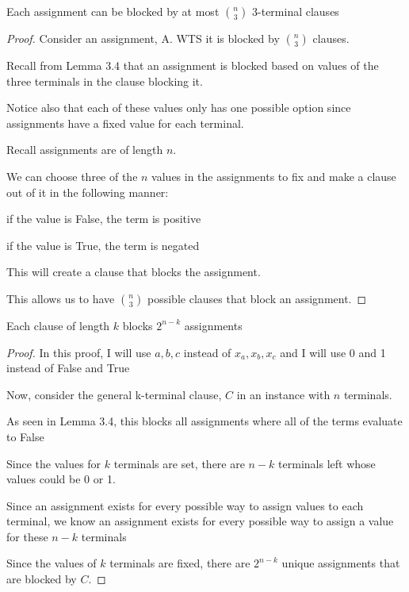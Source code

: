 \documentclass[manuscript]{acmart}
\begin{document}
    \begin{lemma}
        Each assignment can be blocked by at most ${n \choose 3}$ 3-terminal clauses
    \end{lemma}
    \begin{proof}
        Consider an assignment, A. WTS it is blocked by ${n \choose 3}$ clauses.

        Recall from Lemma 3.4 that an assignment is blocked based on values of
        the three terminals in the clause blocking it.

        Notice also that each of these values only has one possible option since
        assignments have a fixed value for each terminal.

        Recall assignments are of length $n$.

        We can choose three of the $n$ values in the assignments to fix and
        make a clause out of it in the following manner:

        if the value is False, the term is positive

        if the value is True, the term is negated

        This will create a clause that blocks the assignment.

        This allows us to have ${n \choose 3}$ possible clauses that block an assignment.
        
    \end{proof}

    \begin{lemma}
        Each clause of length $k$ blocks $2^{n-k}$ assignments
    \end{lemma}
    \begin{proof}
        In this proof, I will use $a, b, c$ instead of $x_a, x_b, x_c$ and
        I will use 0 and 1 instead of False and True

        Now, consider the general k-terminal clause, $C$ in an instance with
        $n$ terminals.

        As seen in Lemma 3.4, this blocks all assignments where all of the terms evaluate to False

        Since the values for $k$ terminals are set, there are $n-k$ terminals left
        whose values could be 0 or 1.

        Since an assignment exists for every possible way to assign values to
        each terminal, we know an assignment exists for every possible way to
        assign a value for these $n-k$ terminals

        Since the values of $k$ terminals are fixed, there are $2^{n-k}$
        unique assignments that are blocked by $C$.
    \end{proof}
\end{document}
